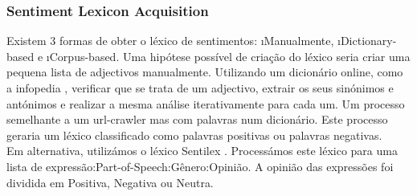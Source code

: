 \subsubsection{Sentiment Lexicon Acquisition}
Existem 3 formas de obter o léxico de sentimentos: \i{Manualmente}, \i{Dictionary-based} e \i{Corpus-based}. Uma hipótese possível de criação do léxico seria criar uma pequena lista de adjectivos manualmente. Utilizando um dicionário online, como a infopedia \cite{infopedia}, verificar que se trata de um adjectivo, extrair os seus sinónimos e antónimos e realizar a mesma análise iterativamente para cada um. Um processo semelhante a um url-crawler mas com palavras num dicionário. Este processo geraria um léxico classificado como palavras positivas ou palavras negativas.\\
Em alternativa, utilizámos o léxico Sentilex \cite{sentilex}. Processámos este léxico para uma lista de expressão:Part-of-Speech:Gênero:Opinião. A opinião das expressões foi dividida em Positiva, Negativa ou Neutra.